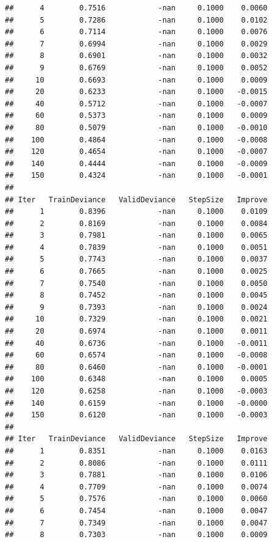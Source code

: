 \documentclass[
]{book}
\begin{document}
\begin{verbatim}
##      4        0.7516            -nan     0.1000    0.0060
##      5        0.7286            -nan     0.1000    0.0102
##      6        0.7114            -nan     0.1000    0.0076
##      7        0.6994            -nan     0.1000    0.0029
##      8        0.6901            -nan     0.1000    0.0032
##      9        0.6769            -nan     0.1000    0.0052
##     10        0.6693            -nan     0.1000    0.0009
##     20        0.6233            -nan     0.1000   -0.0015
##     40        0.5712            -nan     0.1000   -0.0007
##     60        0.5373            -nan     0.1000    0.0009
##     80        0.5079            -nan     0.1000   -0.0010
##    100        0.4864            -nan     0.1000   -0.0008
##    120        0.4654            -nan     0.1000   -0.0007
##    140        0.4444            -nan     0.1000   -0.0009
##    150        0.4324            -nan     0.1000   -0.0001
## 
## Iter   TrainDeviance   ValidDeviance   StepSize   Improve
##      1        0.8396            -nan     0.1000    0.0109
##      2        0.8169            -nan     0.1000    0.0084
##      3        0.7981            -nan     0.1000    0.0065
##      4        0.7839            -nan     0.1000    0.0051
##      5        0.7743            -nan     0.1000    0.0037
##      6        0.7665            -nan     0.1000    0.0025
##      7        0.7540            -nan     0.1000    0.0050
##      8        0.7452            -nan     0.1000    0.0045
##      9        0.7393            -nan     0.1000    0.0024
##     10        0.7329            -nan     0.1000    0.0021
##     20        0.6974            -nan     0.1000    0.0011
##     40        0.6736            -nan     0.1000   -0.0011
##     60        0.6574            -nan     0.1000   -0.0008
##     80        0.6460            -nan     0.1000   -0.0001
##    100        0.6348            -nan     0.1000    0.0005
##    120        0.6258            -nan     0.1000   -0.0003
##    140        0.6159            -nan     0.1000   -0.0000
##    150        0.6120            -nan     0.1000   -0.0003
## 
## Iter   TrainDeviance   ValidDeviance   StepSize   Improve
##      1        0.8351            -nan     0.1000    0.0163
##      2        0.8086            -nan     0.1000    0.0111
##      3        0.7881            -nan     0.1000    0.0106
##      4        0.7709            -nan     0.1000    0.0074
##      5        0.7576            -nan     0.1000    0.0060
##      6        0.7454            -nan     0.1000    0.0047
##      7        0.7349            -nan     0.1000    0.0047
##      8        0.7303            -nan     0.1000    0.0009

\end{verbatim}
\end{document}
